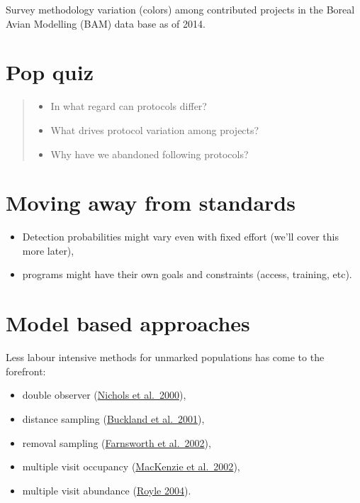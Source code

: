 \documentclass[12pt,]{book}
\providecommand{\tightlist}{%
  \setlength{\itemsep}{0pt}\setlength{\parskip}{0pt}}
\begin{document}
Survey methodology variation (colors) among contributed projects
in the Boreal Avian Modelling (BAM) data base as of 2014.

\hypertarget{pop-quiz}{%
\section{Pop quiz}\label{pop-quiz}}

\begin{quote}
\begin{itemize}
\tightlist
\item
  In what regard can protocols differ?
\item
  What drives protocol variation among projects?
\item
  Why have we abandoned following protocols?
\end{itemize}
\end{quote}

\hypertarget{moving-away-from-standards}{%
\section{Moving away from standards}\label{moving-away-from-standards}}

\begin{itemize}
\tightlist
\item
  Detection probabilities might vary even with fixed effort (we'll cover this more later),
\item
  programs might have their own goals and constraints (access, training, etc).
\end{itemize}

\hypertarget{model-based-approaches}{%
\section{Model based approaches}\label{model-based-approaches}}

Less labour intensive methods for unmarked populations has come to the forefront:

\begin{itemize}
\tightlist
\item
  double observer (\href{https://doi.org/10.1642/0004-8038(2000)117\%5B0393:ADOAFE\%5D2.0.CO;2}{Nichols et al.~2000}),
\item
  distance sampling (\href{https://global.oup.com/academic/product/introduction-to-distance-sampling-9780198509271}{Buckland et al.~2001}),
\item
  removal sampling (\href{https://doi.org/10.1642/0004-8038(2002)119\%5B0414:ARMFED\%5D2.0.CO;2}{Farnsworth et al.~2002}),
\item
  multiple visit occupancy (\href{https://doi.org/10.1890/0012-9658(2002)083\%5B2248:ESORWD\%5D2.0.CO;2}{MacKenzie et al.~2002}),
\item
  multiple visit abundance (\href{https://doi.org/10.1111/j.0006-341X.2004.00142.x}{Royle 2004}).
\end{itemize}
\end{document}
